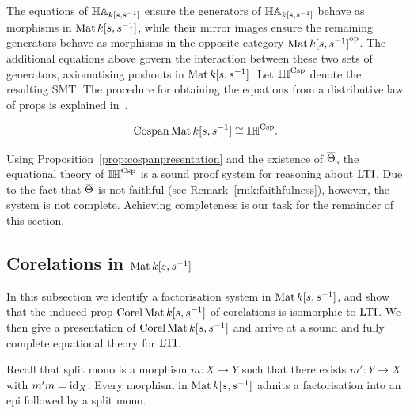 The equations of $\mathbb{HA}_{k[s,s^{-1}]}$ ensure the generators of $\mathbb{HA}_{k[s,s^{-1}]}$ behave as
morphisms in $\operatorname{\mathrm{Mat}}{k[s,s^{-1}]}$, while their mirror images ensure the remaining
generators behave as morphisms in the opposite category $\operatorname{\mathrm{Mat}}{k[s,s^{-1}]}^{\mathrm{op}}$.
The additional equations above govern the interaction between these two sets of
generators, axiomatising pushouts in $\operatorname{\mathrm{Mat}}{k[s,s^{-1}]}$.
%
Let $\mathbb{IH}^{\mathrm{Csp}}$ denote the resulting SMT.
The procedure for obtaining the equations from a distributive law of props 
is explained in~\cite[\S{3.3}]{Za}.
\begin{proposition}\label{prop:cospanpresentation}
\[\operatorname{{Cospan}} \operatorname{\mathrm{Mat}}{k[s,s^{-1}]} \cong \mathbb{IH}^{\mathrm{Csp}}.\]
\end{proposition}

Using Proposition~\ref{prop:cospanpresentation} and the existence of $\overline{\Theta}$,
the equational theory of $\mathbb{IH}^{\mathrm{Csp}}$ is a sound proof system for reasoning about
$\operatorname{\mathrm{LTI}}$. Due to the fact that $\overline{\Theta}$ is not faithful (see
Remark~\ref{rmk:faithfulness}), however, the system is not complete. Achieving
completeness is our task for the remainder of this section.


\subsection{Corelations in $\operatorname{\mathrm{Mat}}{k[s,s^{-1}]}$}


In this subsection we identify a factorisation system in $\operatorname{\mathrm{Mat}}{k[s,s^{-1}]}$, and show
that the induced prop $\operatorname{{Corel}}\operatorname{\mathrm{Mat}}{k[s,s^{-1}]}$ of corelations is isomorphic to $\operatorname{\mathrm{LTI}}$.
We then give a presentation of $\operatorname{{Corel}}\operatorname{\mathrm{Mat}}{k[s,s^{-1}]}$ and arrive at a sound and fully
complete equational theory for $\operatorname{\mathrm{LTI}}$.

Recall that split mono is a morphism $m\colon X\to Y$ such that there exists
$m'\colon Y\to X$ with $m'm=\mathrm{id}_X$. Every morphism in $\operatorname{\mathrm{Mat}}{k[s,s^{-1}]}$ admits a
factorisation into an epi followed by a split mono. 

